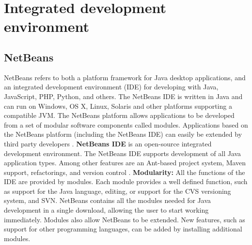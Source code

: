 \section{Integrated development environment}

\subsection{NetBeans}
NetBeans refers to both a platform framework for Java desktop applications, and an integrated development environment (IDE) for developing with Java, JavaScript, PHP, Python, and others.
The NetBeans IDE is written in Java and can run on Windows, OS X, Linux, Solaris and other platforms supporting a compatible JVM. 
\newline
\newline
The NetBeans platform allows applications to be developed from a set of modular software components called modules. Applications based on the NetBeans platform (including the NetBeans IDE) can easily be extended by third party developers \cite{bib:netbeans}.
\newline
\newline
\textbf{NetBeans IDE} is an open-source integrated development environment. The NetBeans IDE supports development of all Java application types. Among other features are an Ant-based project system, Maven support, refactorings, and version control \cite{bib:ide}.
\newline
\newline
\textbf{Modularity:} All the functions of the IDE are provided by modules. Each module provides a well defined function, such as support for the Java language, editing, or support for the CVS versioning system, and SVN. NetBeans contains all the modules needed for Java development in a single download, allowing the user to start working immediately. Modules also allow NetBeans to be extended. New features, such as support for other programming languages, can be added by installing additional modules.
